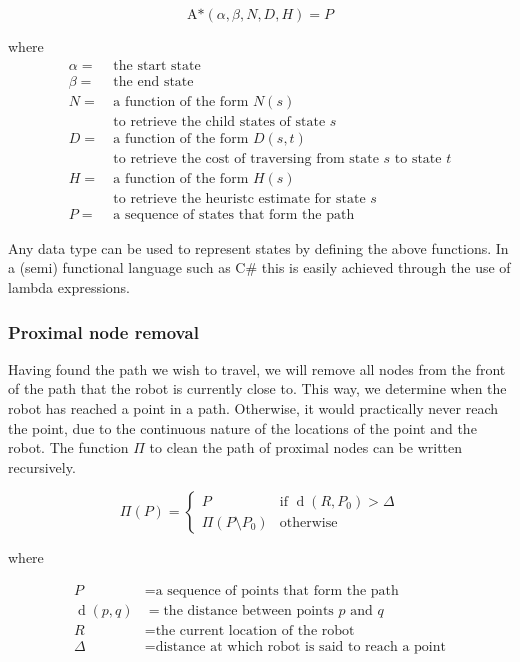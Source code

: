 \documentclass[10pt,twocolumn]{scrartcl}
\DeclareMathOperator{\dist}{d}
\begin{document}
\[
\textrm{A*}(\alpha,\beta,N,D,H) = P
\]

where
\begin{align*}
\alpha =&\ \textrm{the start state} \\
\beta =&\ \textrm{the end state} \\
N =&\ \textrm{a function of the form $N(s)$} \\
&\ \textrm{to retrieve the child states of state $s$} \\
D =&\ \textrm{a function of the form $D(s,t)$} \\
&\ \textrm{to retrieve the cost of traversing from state $s$ to state $t$} \\
H =&\ \textrm{a function of the form $H(s)$} \\
&\ \textrm{to retrieve the heuristc estimate for state $s$} \\
P =&\ \textrm{a sequence of states that form the path}
\end{align*}

Any data type can be used to represent states by defining the above functions. In a (semi) functional language such as C\# this is easily achieved through the use of lambda expressions.

\subsubsection{Proximal node removal}
Having found the path we wish to travel, we will remove all nodes from the front of the path that the robot is currently close to. This way, we determine when the robot has reached a point in a path. Otherwise, it would practically never reach the point, due to the continuous nature of the locations of the point and the robot. The function $\Pi$ to clean the path of proximal nodes can be written recursively.

\[
\Pi(P) =
	\begin{cases}
	P & \textrm{if } \dist(R,P_0) > \Delta \\
	\Pi( P \setminus P_0 ) & \textrm{otherwise}
	\end{cases}
\]

where

\begin{align*}
P &= \textrm{a sequence of points that form the path} \\
\dist(p,q) &= \textrm{the distance between points $p$ and $q$} \\
R &= \textrm{the current location of the robot} \\
\Delta &= \textrm{distance at which robot is said to reach a point}
\end{align*}
\end{document}
